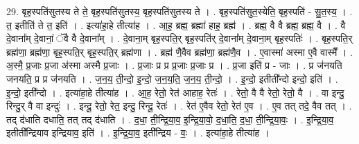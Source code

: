 \documentclass[17pt]{extarticle}
\begin{document}
29. बृह॒स्पति॑सुतस्य ते ते॒ बृह॒स्पति॑सुतस्य॒ बृह॒स्पति॑सुतस्य ते । . बृह॒स्पति॑सुत॒स्येति॒ बृह॒स्पति॑ - सु॒त॒स्य॒ । . त॒ इतीति॑ ते त॒ इति॑ । . इत्या॑हा॒हे तीत्या॑ह । . आ॒ह॒ ब्रह्म॒ ब्रह्मा॑ हाह॒ ब्रह्म॑ । . ब्रह्म॒ वै वै ब्रह्म॒ ब्रह्म॒ वै । . वै दे॒वाना᳚म् दे॒वानां॒ ॅवै वै दे॒वाना᳚म् । . दे॒वाना॒म् बृह॒स्पति॒र् बृह॒स्पति॑र् दे॒वाना᳚म् दे॒वाना॒म् बृह॒स्पतिः॑ । . बृह॒स्पति॒र् ब्रह्म॑णा॒ ब्रह्म॑णा॒ बृह॒स्पति॒र् बृह॒स्पति॒र् ब्रह्म॑णा । . ब्रह्म॑ णै॒वैव ब्रह्म॑णा॒ ब्रह्म॑णै॒व । . ए॒वास्मा॑ अस्मा ए॒वै वास्मै᳚ । . अ॒स्मै॒ प्र॒जाः प्र॒जा अ॑स्मा अस्मै प्र॒जाः । . प्र॒जाः प्र प्र प्र॒जाः प्र॒जाः प्र । . प्र॒जा इति॑ प्र - जाः । . प्र ज॑नयति जनयति॒ प्र प्र ज॑नयति । . ज॒न॒य॒ ती॒न्दो॒ इ॒न्दो॒ ज॒न॒य॒ति॒ ज॒न॒य॒ ती॒न्दो॒ । . इ॒न्दो॒ इतीती᳚न्दो इन्दो॒ इति॑ । . इ॒न्दो॒ इती᳚न्दो । . इत्या॑हा॒हे तीत्या॑ह । . आ॒ह॒ रेतो॒ रेत॑ आहाह॒ रेतः॑ । . रेतो॒ वै वै रेतो॒ रेतो॒ वै । . वा इन्दु॒ रिन्दु॒र् वै वा इन्दुः॑ । . इन्दू॒ रेतो॒ रेत॒ इन्दु॒ रिन्दू॒ रेतः॑ । . रेत॑ ए॒वैव रेतो॒ रेत॑ ए॒व । . ए॒व तत् तदे॒ वैव तत् । . तद् द॑धाति दधाति॒ तत् तद् द॑धाति । . द॒धा॒ ती॒न्द्रि॒या॒व॒ इ॒न्द्रि॒या॒वो॒ द॒धा॒ति॒ द॒धा॒ ती॒न्द्रि॒या॒वः॒ । . इ॒न्द्रि॒या॒व॒ इतीती᳚न्द्रियाव इन्द्रियाव॒ इति॑ । . इ॒न्द्रि॒या॒व॒ इती᳚न्द्रिय - वः॒ । . इत्या॑हा॒हे तीत्या॑ह । \newline
\end{document}
